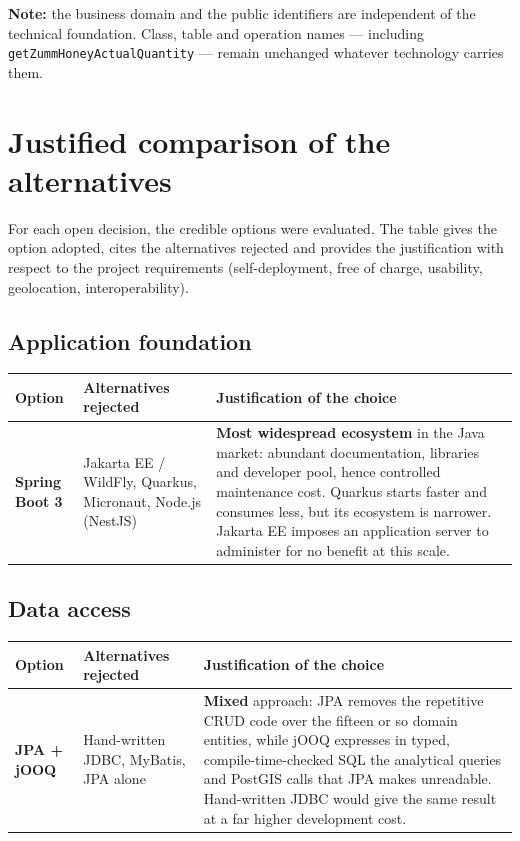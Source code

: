 \begin{encadre}
\textbf{Note:} the business domain and the public identifiers are independent of
the technical foundation. Class, table and operation names --- including
\texttt{getZummHoneyActualQuantity} --- remain unchanged whatever technology
carries them.
\end{encadre}

\section{Justified comparison of the alternatives}
For each open decision, the credible options were evaluated. The table gives the
option adopted, cites the alternatives rejected and provides the justification
with respect to the project requirements (self-deployment, free of charge,
usability, geolocation, interoperability).

\subsection{Application foundation}
\begin{xltabular}{\textwidth}{>{\bfseries}p{2.7cm} p{4.2cm} X}
\toprule
\textbf{Option} & \textbf{Alternatives rejected} & \textbf{Justification of the choice} \\
\midrule
\endhead
Spring Boot 3 & Jakarta EE / WildFly, Quarkus, Micronaut, Node.js (NestJS) & \textbf{Most widespread ecosystem} in the Java market: abundant documentation, libraries and developer pool, hence controlled maintenance cost. Quarkus starts faster and consumes less, but its ecosystem is narrower. Jakarta EE imposes an application server to administer for no benefit at this scale. \\
\bottomrule
\end{xltabular}

\subsection{Data access}
\begin{xltabular}{\textwidth}{>{\bfseries}p{2.7cm} p{4.2cm} X}
\toprule
\textbf{Option} & \textbf{Alternatives rejected} & \textbf{Justification of the choice} \\
\midrule
\endhead
JPA + jOOQ & Hand-written JDBC, MyBatis, JPA alone & \textbf{Mixed} approach: JPA removes the repetitive CRUD code over the fifteen or so domain entities, while jOOQ expresses in typed, compile-time-checked SQL the analytical queries and PostGIS calls that JPA makes unreadable. Hand-written JDBC would give the same result at a far higher development cost. \\
\bottomrule
\end{xltabular}

